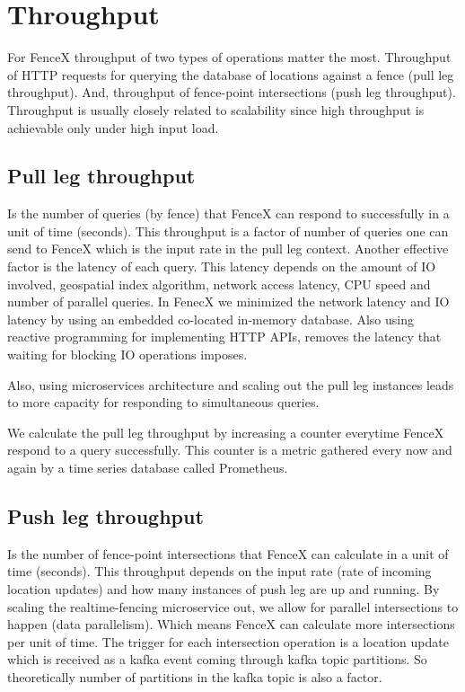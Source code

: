 \documentclass[a4]{report}
\begin{document}
    \section{Throughput}
    For FenceX throughput of two types of operations matter the most.
    Throughput of HTTP requests for querying the database of locations against a fence (pull leg throughput).
    And, throughput of fence-point intersections (push leg throughput).
    Throughput is usually closely related to scalability since high throughput is achievable only under high input load.

    \subsection{Pull leg throughput}
    Is the number of queries (by fence) that FenceX can respond to successfully in a unit of time (seconds).
    This throughput is a factor of number of queries one can send to FenceX which is the input rate in the pull leg context.
    Another effective factor is the latency of each query.
    This latency depends on the amount of IO involved, geospatial index algorithm, network access latency, CPU speed
    and number of parallel queries.
    In FenecX we minimized the network latency and IO latency by using an embedded co-located in-memory database.
    Also using reactive programming for implementing HTTP APIs, removes the latency that waiting for blocking IO
    operations imposes.

    Also, using microservices architecture and scaling out the pull leg instances leads to more capacity for responding
    to simultaneous queries.

    We calculate the pull leg throughput by increasing a counter everytime FenceX respond to a query successfully.
    This counter is a metric gathered every now and again by a time series database called Prometheus\cite{prometheus}.

    \subsection{Push leg throughput}
    Is the number of fence-point intersections that FenceX can calculate in a unit of time (seconds).
    This throughput depends on the input rate (rate of incoming location updates) and how many instances of push leg
    are up and running.
    By scaling the realtime-fencing microservice out, we allow for parallel intersections to happen (data parallelism).
    Which means FenceX can calculate more intersections per unit of time.
    The trigger for each intersection operation is a location update which is received as a kafka event coming through
    kafka topic partitions.
    So theoretically number of partitions in the kafka topic is also a factor.
\end{document}
